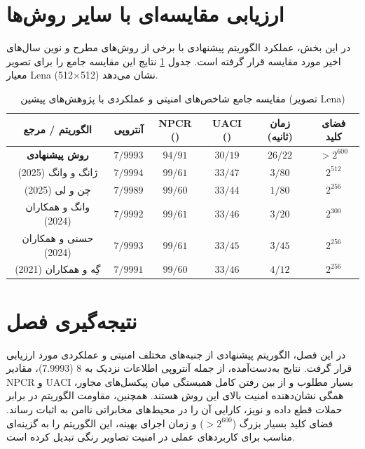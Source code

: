 \documentclass[a4paper,12pt]{report}
\renewcommand{\%}{\lr{\oldpercent}}
\providecommand{\lr}[1]{#1}
\begin{document}
\section{ارزیابی مقایسه‌ای با سایر روش‌ها}
در این بخش، عملکرد الگوریتم پیشنهادی با برخی از روش‌های مطرح و نوین سال‌های اخیر مورد مقایسه قرار گرفته است. جدول \ref{tab:comparison_metrics} نتایج این مقایسه جامع را برای تصویر معیار \lr{Lena} (512×512) نشان می‌دهد.

\begin{table}[h]
\centering
\caption{مقایسه جامع شاخص‌های امنیتی و عملکردی با پژوهش‌های پیشین (تصویر \lr{Lena})} \label{tab:comparison_metrics}
\small
\begin{tabular}{|c|c|c|c|c|c|}
\hline
\textbf{الگوریتم / مرجع} & \textbf{آنتروپی} & \textbf{\lr{NPCR (\%)}} & \textbf{\lr{UACI (\%)}} & \textbf{زمان (ثانیه)} & \textbf{فضای کلید} \\ \hline
\textbf{روش پیشنهادی} & \textbf{$7/9993$} & \textbf{$94/91$} & \textbf{$30/19$} & \textbf{$26/22$} & \lr{$> 2^{600}$} \\ \hline
ژانگ و وانگ \cite{ref51} (2025) & $7/9994$ & $99/61$ & $33/47$ & $3/80$ & \lr{$2^{512}$} \\ \hline
چن و لی \cite{ref62} (2025) & $7/9989$ & $99/60$ & $33/44$ & $1/80$ & \lr{$2^{256}$} \\ \hline
وانگ و همکاران \cite{ref61} (2024) & $7/9992$ & $99/61$ & $33/46$ & $3/20$ & \lr{$2^{300}$} \\ \hline
حسنی و همکاران \cite{ref13} (2024) & $7/9993$ & $99/61$ & $33/45$ & $3/45$ & \lr{$2^{256}$} \\ \hline
گِه و همکاران \cite{ref12} (2021) & $7/9991$ & $99/60$ & $33/46$ & $4/12$ & \lr{$2^{256}$} \\ \hline
\end{tabular}
\end{table}

\section{نتیجه‌گیری فصل}
در این فصل، الگوریتم پیشنهادی از جنبه‌های مختلف امنیتی و عملکردی مورد ارزیابی قرار گرفت. نتایج به‌دست‌آمده، از جمله آنتروپی اطلاعات نزدیک به 8 (\lr{7.9993})، مقادیر \lr{NPCR} و \lr{UACI} بسیار مطلوب و از بین رفتن کامل همبستگی میان پیکسل‌های مجاور، همگی نشان‌دهنده امنیت بالای این روش هستند. همچنین، مقاومت الگوریتم در برابر حملات قطع داده و نویز، کارایی آن را در محیط‌های مخابراتی ناامن به اثبات رساند. فضای کلید بسیار بزرگ ($> 2^{600}$) و زمان اجرای بهینه، این الگوریتم را به گزینه‌ای مناسب برای کاربردهای عملی در امنیت تصاویر رنگی تبدیل کرده است.
\end{document}

